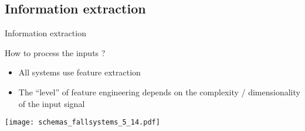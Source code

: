 \subsection{Information extraction}
\begin{frame}{Information extraction}

    \begin{minipage}[t]{0.49\linewidth}
    \vspace{0pt}
    How to process the inputs ?
    \begin{itemize}
        \item All systems use feature extraction
        \item The ``level'' of feature engineering depends on the complexity / dimensionality of the input signal
    \end{itemize}
    \end{minipage}
    \hfill
    \begin{minipage}[t]{0.49\linewidth}
    \vspace{0pt}
        \begin{overprint}
            \texttt{[image: schemas\_fallsystems\_5\_14.pdf]}
        \end{overprint}
    \end{minipage}
\end{frame}




